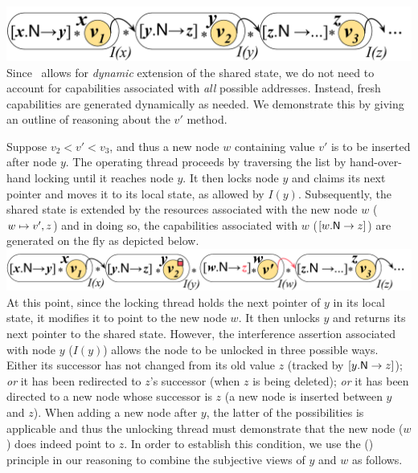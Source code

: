 %
{\centering \includegraphics[scale=0.24]{Sections/FurtherExamples/Images/coloslSet.pdf}\\}
%
\noindent Since \colosl\ allows for \emph{dynamic} extension of the shared state, we do not need to account for capabilities associated with \emph{all} possible addresses. Instead, fresh capabilities are generated dynamically as needed. We demonstrate this by giving an outline of reasoning about the $v'$\li{)} method. 

Suppose $v_2 < v' < v_3$, and thus a new node $w$ containing value $v'$ is to be inserted after node $y$.  The operating thread proceeds by traversing the list by hand-over-hand locking until it reaches node $y$. It then locks node $y$ and claims its next pointer and moves it to its local state, as allowed by $I(y)$. Subsequently, the shared state is extended by the resources associated with the new node $w$ ($w \mapsto v', z$) and in doing so, the capabilities associated with $w$ ($\nextC{w}{z}$) are generated on the fly as depicted below.\\
%
\includegraphics[scale=0.215]{Sections/FurtherExamples/Images/add1.pdf}\\
%
At this point, since the locking thread holds the next pointer of $y$ in its local state, it modifies it to point to the new node $w$. It then unlocks $y$ and returns its next pointer to the shared state. However, the interference assertion associated with node $y$ ($I(y)$) allows the node to be unlocked in three possible ways. Either its successor has not changed from its old value $z$ (tracked by $\nextC{y}{z}$); \emph{or} it has been redirected to $z$'s successor (when $z$ is being deleted); \emph{or} it has been directed to a new node whose successor is $z$ (a new node is inserted between $y$ and $z$). When adding a new node after $y$, the latter of the possibilities is applicable and thus the unlocking thread must demonstrate that the new node ($w$) does indeed point to $z$. In order to establish this condition, we use the (\mergeRule) principle in our reasoning to combine the subjective views of $y$ and $w$ as follows.\\
